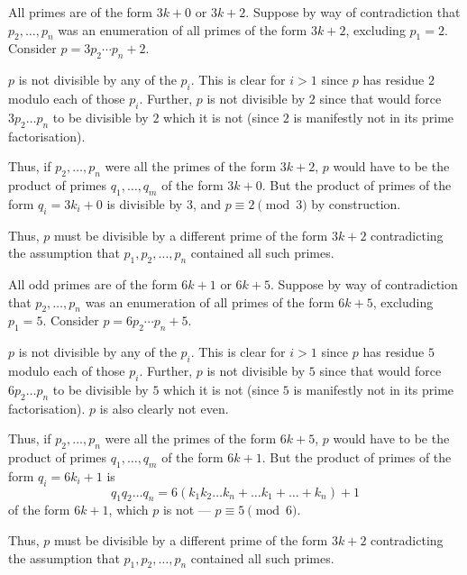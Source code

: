 \documentclass[12 pt, letterpaper]{hmcpset}
\begin{document}
\begin{solution}
	All primes are of the form $3k + 0$ or $3k + 2$. Suppose by way of contradiction that $p_{2}, \dots, p_{n}$ was an enumeration of all primes of the form $3k + 2$, excluding $p_{1} = 2$. Consider $p = 3 p_{2} \cdots p_{n} + 2$.

	$p$ is not divisible by any of the $p_{i}$. This is clear for $i > 1$ since $p$ has residue $2$ modulo each of those $p_{i}$. Further, $p$ is not divisible by $2$ since that would force $3 p_{2} \dots p_{n}$ to be divisible by $2$ which it is not (since $2$ is manifestly not in its prime factorisation).

	Thus, if $p_{2}, \dots, p_{n}$ were all the primes of the form $3k + 2$, $p$ would have to be the product of primes $q_{1}, \dots, q_{m}$ of the form $3k + 0$. But the product of primes of the form $q_{i} = 3k_{i} + 0$ is divisible by $3$, and $p \equiv 2 \pmod 3$ by construction.

	Thus, $p$ must be divisible by a different prime of the form $3k + 2$ contradicting the assumption that $p_{1}, p_{2}, \dots, p_{n}$ contained all such primes.
\end{solution}

\begin{solution}
	All odd primes are of the form $6k + 1$ or $6k + 5$. Suppose by way of contradiction that $p_{2}, \dots, p_{n}$ was an enumeration of all primes of the form $6k + 5$, excluding $p_{1} = 5$. Consider $p = 6 p_{2} \cdots p_{n} + 5$.

	$p$ is not divisible by any of the $p_{i}$. This is clear for $i > 1$ since $p$ has residue $5$ modulo each of those $p_{i}$. Further, $p$ is not divisible by $5$ since that would force $6 p_{2} \dots p_{n}$ to be divisible by $5$ which it is not (since $5$ is manifestly not in its prime factorisation). $p$ is also clearly not even.

	Thus, if $p_{2}, \dots, p_{n}$ were all the primes of the form $6k + 5$, $p$ would have to be the product of primes $q_{1}, \dots, q_{m}$ of the form $6k + 1$. But the product of primes of the form $q_{i} = 6k_{i} + 1$ is
	\[
		q_{1} q_{2} \dots q_{n} = 6 (k_{1} k_{2} \dots k_{n} + \dots k_{1} + \dots + k_{n}) + 1
	\]
	of the form $6k + 1$, which $p$ is not --- $p \equiv 5 \pmod 6$.

	Thus, $p$ must be divisible by a different prime of the form $3k + 2$ contradicting the assumption that $p_{1}, p_{2}, \dots, p_{n}$ contained all such primes.
\end{solution}
\end{document}
